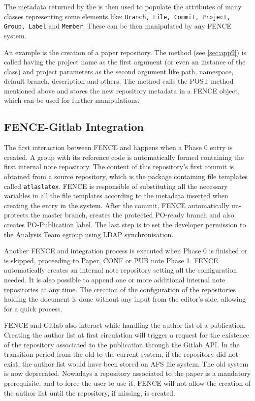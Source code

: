 The metadata returned by the  is then used to populate the attributes of many classes representing some \gitlab elements like: 
\texttt{Branch, File, Commit, Project, Group, Label} and \texttt{Member}.
These can be then manipulated by any FENCE system.

An example is the creation of a paper repository.
The  method (see \cref{sec:app9}) is called having the project name as the first argument (or even an instance of the  class) and project parameters as the second argument like path, namespace, default branch, description and others.
The method calls the POST method mentioned above and stores the new repository metadata in a FENCE  object, which can be used for further manipulations.


\subsection{FENCE-Gitlab Integration}%
\label{sec:FENCE-Gitlab_Integration}
The first interaction between FENCE and \gitlab happens when a Phase 0 entry is created.
A group with its reference code is automatically formed containing the first internal note repository.
The content of this repository’s first commit is obtained from a source repository,
which is the package containing file templates called \texttt{atlaslatex}.
FENCE is responsible of substituting all the necessary variables in all the file templates according to the metadata inserted when creating the entry in the system. After the commit, FENCE automatically un-protects the master branch, creates the protected PO-ready branch and also creates PO-Publication label. The last step is to set the developer permission to the Analysis Team egroup using LDAP synchronisation.
                    
Another FENCE and \gitlab integration process is executed when Phase 0 is finished or is skipped, proceeding to Paper, CONF or PUB note Phase 1.
FENCE automatically creates an internal note repository setting all the configuration needed.
It is also possible to append one or more additional internal note repositories at any time.
The creation of the configuration of the repositories holding the document is done without any input from the editor’s side, allowing for a quick process. 

FENCE and Gitlab also interact while handling the author list of a publication.
Creating the author list at first circulation will trigger a request for the existence of the \gitlab repository associated to the publication through the Gitlab API\@.
In the transition period from the old to the current system,
if the repository did not exist, the author list would have been stored on AFS file system.
The old system is now deprecated.
Nowadays a \gitlab repository associated to the paper is a mandatory prerequisite, and to force the user to use it,
FENCE will not allow the creation of the author list until the repository, if missing, is created.

